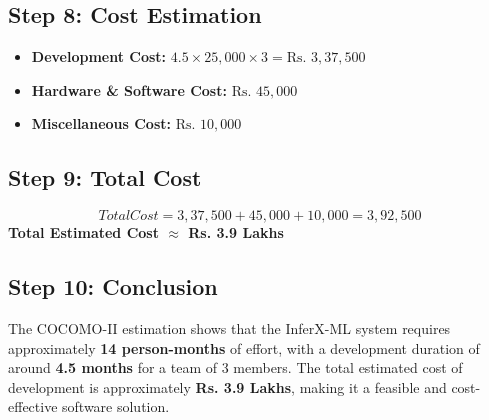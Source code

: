\subsection*{Step 8: Cost Estimation}
\begin{itemize}
    \item[a)] \textbf{Development Cost:} $4.5 \times 25,000 \times 3 = \text{Rs. } 3,37,500$
    \item[b)] \textbf{Hardware \& Software Cost:} $\text{Rs. } 45,000$
    \item[c)] \textbf{Miscellaneous Cost:} $\text{Rs. } 10,000$
\end{itemize}

\subsection*{Step 9: Total Cost}
\[ TotalCost = 3,37,500 + 45,000 + 10,000 = 3,92,500 \]
\textbf{Total Estimated Cost $\approx$ Rs. 3.9 Lakhs}
\vspace{0.4cm}

\subsection*{Step 10: Conclusion}
The COCOMO-II estimation shows that the InferX-ML system requires approximately \textbf{14 person-months} of effort, with a development duration of around \textbf{4.5 months} for a team of 3 members. The total estimated cost of development is approximately \textbf{Rs. 3.9 Lakhs}, making it a feasible and cost-effective software solution.
